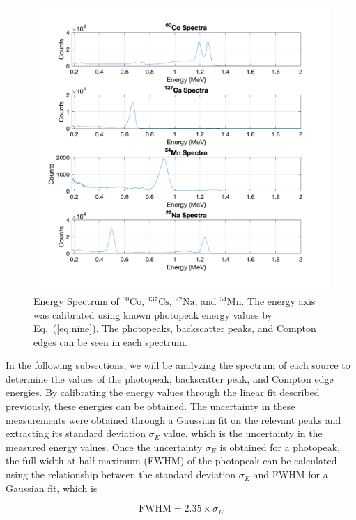 \documentclass[%
 aip,
rsi,%
 amsmath,amssymb,
 reprint,%
author-numerical,%
]{revtex4-1}
\begin{document}
\begin{figure}
\includegraphics[width=0.9\linewidth]{lateximages/4spectra.png} 
\caption{\label{fig:4spectra} Energy Spectrum of $\mathrm { ^ { 60 }Co}  $, $\mathrm {  ^ { 137 }Cs }$, $\mathrm { ^ { 22 }Na }$, and $\mathrm { ^ { 54 }Mn } $. The energy axis was calibrated using known photopeak energy values by Eq.~(\ref{eq:nine}). The photopeaks, backscatter peaks, and Compton edges can be seen in each spectrum. }
\end{figure}

\indent In the following subsections, we will be analyzing the spectrum of each source to determine the values of the photopeak, backscatter peak, and Compton edge energies. By calibrating the energy values through the linear fit described previously, these energies can be obtained. \newline
\indent The uncertainty in these measurements were obtained through a Gaussian fit on the relevant peaks and extracting its standard deviation $\sigma_E$ value, which is the uncertainty in the measured energy values. Once the uncertainty $\sigma_E$ is obtained for a photopeak, the full width at half maximum (FWHM) of the photopeak can be calculated using the relationship between the standard deviation $\sigma_E$ and FWHM for a Gaussian fit, which is 

\begin{equation}
\text{FWHM}=2.35 \times \sigma_E
 \label{eq:ten}
\end{equation}
\end{document}
